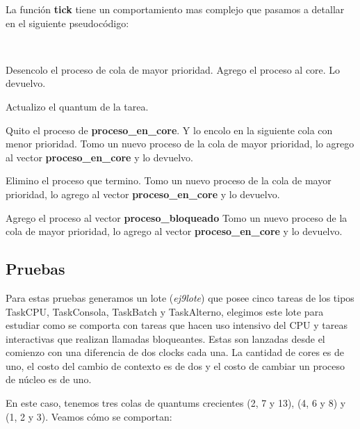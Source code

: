 La función \textbf{tick} tiene un comportamiento mas complejo que pasamos a detallar en el siguiente pseudocódigo:

~

\begin{algorithmic}

		\State Desencolo el proceso de cola de mayor prioridad.
		\State Agrego el proceso al core.
		\State Lo devuelvo.
		
	
		\State Actualizo el quantum de la tarea.

			\State Quito el proceso de \textbf{proceso\_en\_core}. Y lo encolo en la siguiente cola con menor prioridad.
			\State Tomo un nuevo proceso de la cola de mayor prioridad, lo agrego al vector \textbf{proceso\_en\_core} y lo devuelvo.
		\EndIf

		\State Elimino el proceso que termino.
		\State Tomo un nuevo proceso de la cola de mayor prioridad, lo agrego al vector \textbf{proceso\_en\_core} y lo devuelvo.

		\State Agrego el proceso al vector \textbf{proceso\_bloqueado}
		\State Tomo un nuevo proceso de la cola de mayor prioridad, lo agrego al vector \textbf{proceso\_en\_core} y lo devuelvo.
	
	\EndIf
\EndFunction	
\end{algorithmic}

\subsection{Pruebas}

Para estas pruebas generamos un lote (\textit{ej9lote}) que posee cinco tareas de los tipos TaskCPU, TaskConsola, TaskBatch y TaskAlterno, elegimos este lote para estudiar como se comporta con tareas que hacen uso intensivo del CPU y tareas interactivas que realizan llamadas bloqueantes. Estas son lanzadas desde el comienzo con una diferencia de dos clocks cada una. La cantidad de cores es de uno, el costo del cambio de contexto es de dos y el costo de cambiar un proceso de núcleo es de uno.

En este caso, tenemos tres colas de quantums crecientes (2, 7 y 13), (4, 6 y 8) y (1, 2 y 3). Veamos cómo se comportan:

